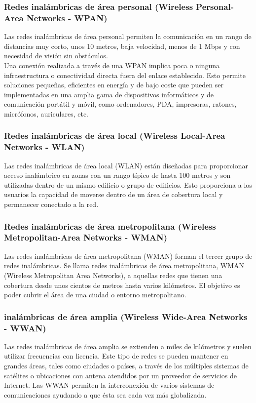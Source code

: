 	
	\subsubsection{\textbf{Redes inalámbricas de área personal (Wireless Personal-Area Networks - WPAN)}}
	Las redes inalámbricas de área personal permiten la comunicación en un rango de distancias muy corto, unos 10 metros, baja velocidad, menos de 1 Mbps y con necesidad de visión sin obstáculos.\\
	
	Una conexión realizada a través de una WPAN implica poca o ninguna infraestructura o conectividad directa fuera del enlace establecido. Esto permite soluciones pequeñas, eficientes en energía y de bajo coste que pueden ser implementadas en una amplia gama de dispositivos informáticos y de comunicación portátil y móvil, como ordenadores, PDA, impresoras, ratones, micrófonos, auriculares, etc.
	
	\subsubsection{\textbf{Redes inalámbricas de área local (Wireless Local-Area Networks - WLAN)}}
	Las redes inalámbricas de área local (WLAN) están diseñadas para proporcionar acceso inalámbrico en zonas con un rango típico de hasta 100 metros y son utilizadas dentro de un mismo edificio o grupo de edificios. Esto proporciona a los usuarios la capacidad de moverse dentro de un área de cobertura local y permanecer conectado a la red. 
	
	\subsubsection{\textbf{Redes inalámbricas de área metropolitana (Wireless Metropolitan-Area Networks - WMAN)}}
	Las redes inalámbricas de área metropolitana (WMAN) forman el tercer grupo de redes inalámbricas. Se llama redes inalámbricas de área metropolitana, WMAN (Wireless Metropolitan Area Networks), a aquellas redes que tienen una cobertura desde unos cientos de metros hasta varios kilómetros. El objetivo es poder cubrir el área de una ciudad o entorno metropolitano. 
	
	\subsubsection{\textbf{inalámbricas de área amplia (Wireless Wide-Area Networks - WWAN)}}
	Las redes inalámbricas de área amplia se extienden a miles de kilómetros y suelen utilizar frecuencias con licencia. Este tipo de redes se pueden mantener en grandes áreas, tales como ciudades o países, a través de los múltiples sistemas de satélites o ubicaciones con antena atendidos por un proveedor de servicios de Internet. Las WWAN permiten la interconexión de varios sistemas de comunicaciones ayudando a que ésta sea cada vez más globalizada.

